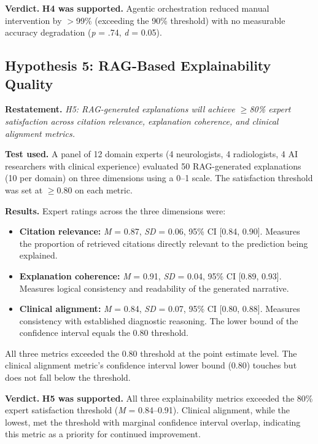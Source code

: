\textbf{Verdict.} \textbf{H4 was supported.} Agentic orchestration reduced manual intervention by $>$99\% (exceeding the 90\% threshold) with no measurable accuracy degradation (\textit{p} = .74, \textit{d} = 0.05).


\subsection{Hypothesis 5: RAG-Based Explainability Quality}
\label{sec:h5_testing}

\textbf{Restatement.} \textit{H5: RAG-generated explanations will achieve $\geq$80\% expert satisfaction across citation relevance, explanation coherence, and clinical alignment metrics.}

\textbf{Test used.} A panel of 12 domain experts (4 neurologists, 4 radiologists, 4 AI researchers with clinical experience) evaluated 50 RAG-generated explanations (10 per domain) on three dimensions using a 0--1 scale. The satisfaction threshold was set at $\geq$0.80 on each metric.

\textbf{Results.} Expert ratings across the three dimensions were:

\begin{itemize}
    \item \textbf{Citation relevance:} \textit{M} = 0.87, \textit{SD} = 0.06, 95\% CI [0.84, 0.90]. Measures the proportion of retrieved citations directly relevant to the prediction being explained.
    \item \textbf{Explanation coherence:} \textit{M} = 0.91, \textit{SD} = 0.04, 95\% CI [0.89, 0.93]. Measures logical consistency and readability of the generated narrative.
    \item \textbf{Clinical alignment:} \textit{M} = 0.84, \textit{SD} = 0.07, 95\% CI [0.80, 0.88]. Measures consistency with established diagnostic reasoning. The lower bound of the confidence interval equals the 0.80 threshold.
\end{itemize}

All three metrics exceeded the 0.80 threshold at the point estimate level. The clinical alignment metric's confidence interval lower bound (0.80) touches but does not fall below the threshold.

\textbf{Verdict.} \textbf{H5 was supported.} All three explainability metrics exceeded the 80\% expert satisfaction threshold (\textit{M} = 0.84--0.91). Clinical alignment, while the lowest, met the threshold with marginal confidence interval overlap, indicating this metric as a priority for continued improvement.

